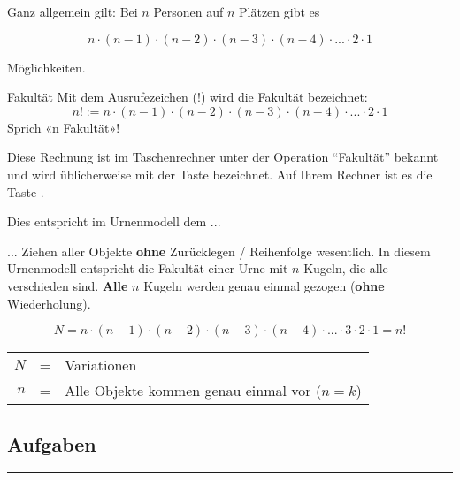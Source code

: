 Ganz allgemein gilt: Bei $n$ Personen auf $n$ Plätzen gibt es

$$n\cdot{} (n-1) \cdot{} (n-2) \cdot{} (n-3) \cdot{} (n-4) \cdot{}
... \cdot{} 2 \cdot{} 1$$

Möglichkeiten.

\begin{definition}{Fakultät}{}
  Mit dem Ausrufezeichen ($!$) wird die Fakultät bezeichnet:
  $$n! := n\cdot{}(n-1) \cdot{} (n-2) \cdot{} (n-3) \cdot{} (n-4) \cdot{}
  ... \cdot{} 2 \cdot{} 1$$
  Sprich «n Fakultät»!
  \end{definition}

Diese Rechnung ist im Taschenrechner unter der Operation ``Fakultät''
bekannt und wird üblicherweise mit der Taste  bezeichnet. Auf
Ihrem Rechner ist es die Taste .

Dies entspricht im Urnenmodell dem ...
\begin{gesetz}{... Ziehen aller Objekte \textbf{ohne} Zurücklegen / Reihenfolge wesentlich.}{}
In diesem Urnenmodell entspricht die Fakultät einer Urne mit $n$ Kugeln, die
alle verschieden sind. \textbf{Alle} $n$ Kugeln werden genau einmal
gezogen (\textbf{ohne} Wiederholung).

$$N = n\cdot{} (n-1) \cdot{} (n-2) \cdot{} (n-3) \cdot{}
(n-4) \cdot{} ... \cdot{} 3\cdot{} 2 \cdot{} 1 = n!$$

\begin{tabular}{rcl}
  $N$ &=& Variationen\\
  $n$ &=& Alle Objekte kommen genau einmal vor ($n=k$) 
\end{tabular}

\end{gesetz}
\newpage


\subsection*{Aufgaben}






\hrule




